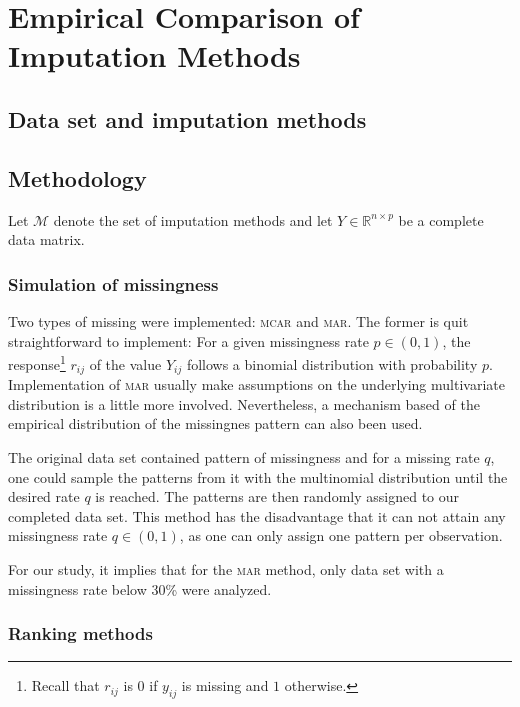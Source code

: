 \chapter{Empirical Comparison of Imputation Methods}



\section{Data set and imputation methods}

\section{Methodology}

Let $\mathcal{M}$ denote the set of imputation methods and let
$Y \in \mathbb{R}^{n\times p}$ be a complete data matrix.

\subsection{Simulation of missingness}

Two types of missing were implemented: \textsc{mcar} and \textsc{mar}. The
former is quit straightforward to implement: For a given missingness rate
$p \in (0, 1)$, the response\footnote{Recall that $r_{ij}$ is $0$ if $y_{ij}$
  is missing and $1$ otherwise.} $r_{ij}$ of the value $Y_{ij}$ follows a
binomial distribution with probability $p$. Implementation of \textsc{mar}
usually make assumptions on the underlying multivariate distribution is a
little more involved. Nevertheless, a mechanism based of the empirical
distribution of the missingnes pattern can also been used.

The original data set contained pattern of missingness and for a missing rate
$q$, one could sample the patterns from it with the multinomial distribution
until the desired rate $q$ is reached. The patterns are then randomly assigned
to our completed data set. This method has the disadvantage that it can not
attain any missingness rate $q \in (0, 1)$, as one can only assign one pattern
per observation.

For our study, it implies that for the \textsc{mar} method, only data set with
a missingness rate below 30\% were analyzed.

\subsection{Ranking methods}

